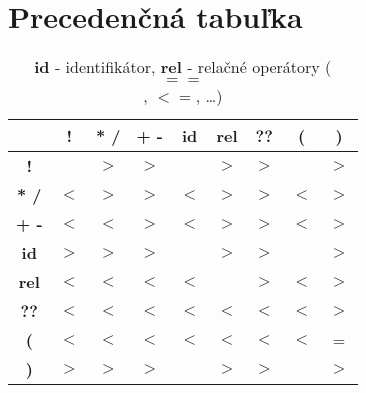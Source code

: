 \documentclass[a4paper,11pt]{article}
\begin{document}
\section{Precedenčná tabuľka}
\begin{table}[htbp]
    \centering
    \begin{tabular}{|c||*{8}{c|}}
        \hline
        \textbf{} & \textbf{!} & \textbf{* /} & \textbf{+ -} & \textbf{id} & \textbf{rel} & \textbf{??} & \textbf{(} & \textbf{)} \\
        \hline\hline
        \textbf{!} & & $>$ & $>$ & & $>$ & $>$ &  & $>$ \\
        \hline
        \textbf{* /} & $<$ & $>$ & $>$ & $<$ & $>$ & $>$ & $<$ & $>$ \\
        \hline
        \textbf{+ -} & $<$ & $<$ & $>$ & $<$ & $>$ & $>$ & $<$ & $>$ \\
        \hline
        \textbf{id} & $>$ & $>$ & $>$ & & $>$ & $>$ & & $>$ \\
        \hline
        \textbf{rel} & $<$ & $<$ & $<$ & $<$ &  & $>$ & $<$ & $>$ \\
        \hline
        \textbf{??} & $<$ & $<$ & $<$ & $<$ & $<$ & $<$ & $<$ & $>$ \\
        \hline
        \textbf{(} & $<$ & $<$ & $<$ & $<$ & $<$ & $<$ & $<$ & = \\
        \hline
        \textbf{)} & $>$ & $>$ & $>$ &  & $>$ & $>$ &  & $>$ \\
        \hline
    \end{tabular}
    \caption{\textbf{id} - identifikátor, \textbf{rel} - relačné operátory ($$==$$, $<$$=$, \dots)}
\end{table}
\end{document}
